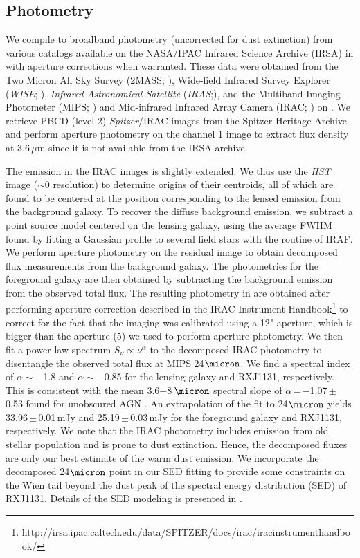 \documentclass[]{emulateapj}
\begin{document}
\subsection{Photometry} \label{sec:photometry} %
We compile \mir to \fir broadband photometry (uncorrected for
dust extinction) from various
catalogs available on the NASA/IPAC Infrared Science
Archive (IRSA) in  with aperture corrections
when warranted. These data were obtained from
the Two Micron All Sky Survey (2MASS; \citealt{Skrutskie06a}),
Wide-field Infrared Survey Explorer ({\it WISE}; \citealt{Wright10a}),
{\it Infrared Astronomical Satellite}
({\it IRAS};\citealt{Neugebauer84a}), and
the Multiband Imaging Photometer (MIPS; \citealt{Rieke04a}) and
Mid-infrared Infrared Array Camera (IRAC; \citealt{Fazio04a}) on
\spitzer.
We retrieve PBCD (level 2) {\it Spitzer}/IRAC images from the
Spitzer Heritage Archive and perform aperture photometry on
the channel 1 image to extract flux density at 3.6\,$\mu$m
since it is not available from the IRSA archive.

The emission in the IRAC images is slightly extended. We thus use the
{\it HST} image ($\sim$0 resolution) to determine
origins of their centroids, all of which are found to be
centered at the position corresponding to the lensed emission from the
background galaxy. To recover the diffuse background emission, we subtract a
point source model centered on the lensing galaxy, using the average
FWHM found by fitting a Gaussian profile to several field stars
with the  routine of IRAF.
We perform aperture photometry on the residual image
to obtain decomposed flux measurements from the background galaxy.
The photometries for the foreground galaxy are then obtained
by subtracting the background emission from the
observed total flux. The resulting photometry in
 are obtained after performing aperture correction
described in the IRAC Instrument Handbook\footnote{http://irsa.ipac.caltech.edu/data/SPITZER/docs/irac/iracinstrumenthandbook/} to
correct for the fact that the imaging was calibrated
using a 12" aperture, which is bigger than the aperture (5) we used to
perform aperture photometry.
We then fit a power-law spectrum $S_\nu \propto \nu^\alpha$ to the
decomposed IRAC photometry to disentangle the observed total flux
at MIPS 24$\micron$. We find a spectral index of $\alpha\sim-$1.8 and
$\alpha\sim-$0.85 for the lensing galaxy and RXJ1131, respectively.
This is consistent with the mean 3.6$-$8\,$\micron$
spectral slope of
$\alpha$\,=\,$-$1.07\,$\pm$\,0.53 found for unobscured AGN
\citep{Stern05a}. An extrapolation of the fit to 24$\micron$
yields 33.96\,$\pm$\,0.01\,mJy and 25.19\,$\pm$\,0.03\,mJy
for the foreground galaxy and RXJ1131, respectively.
We note that the IRAC photometry includes
emission from old stellar population and is prone to
dust extinction. Hence, the decomposed fluxes are only
our best estimate of the warm dust emission.
We incorporate the decomposed 24$\micron$ point in our
SED fitting to provide some constraints on
the Wien tail beyond the dust peak
of the spectral energy distribution (SED) of RXJ1131.
Details of the SED modeling is presented in .
\end{document}
